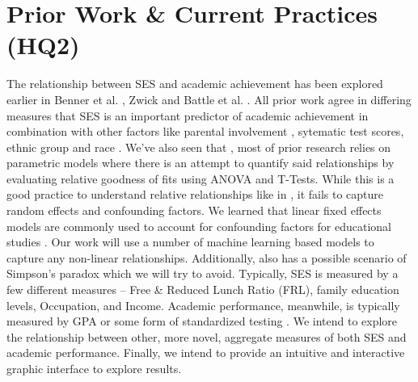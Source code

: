 \documentclass[sigconf,nonacm,11pt]{acmart}
\begin{document}
\section{Prior Work \& Current Practices (HQ2)}

The relationship between SES and academic achievement has been explored earlier in Benner et al. \cite{parentalinvolvement}, Zwick \cite{collegescores} and Battle et al. \cite{raceses}. All prior work agree in differing measures that SES is an important predictor of academic achievement in combination with other factors like parental involvement \cite{parentalinvolvement}, sytematic test scores, ethnic group \cite{collegescores} and race \cite{raceses}. We've also seen that \cite{parentalinvolvement, collegescores, raceses, farooq}, most of prior research relies on parametric models where there is an attempt to quantify said relationships by evaluating relative goodness of fits using ANOVA and T-Tests. While this is a good practice to understand relative relationships like in \cite{collegescores, raceses}, it fails to capture random effects and confounding factors. We learned that linear fixed effects models are commonly used to account for confounding factors for educational studies \cite{winters, jinnai}. Our work will use a number of machine learning based models to capture any non-linear relationships. Additionally, \cite{collegescores} also has a possible scenario of Simpson's paradox which we will try to avoid. Typically, \cite{sirin} SES is measured by a few different measures -- Free \& Reduced Lunch Ratio (FRL), family education levels, Occupation, and Income.  Academic performance, meanwhile, is typically measured by GPA or some form of standardized testing \cite{sirin}.  We intend to explore the relationship between other, more novel, aggregate measures of both SES and academic performance. Finally, we intend to provide an intuitive and interactive graphic interface to explore results.
\end{document}
